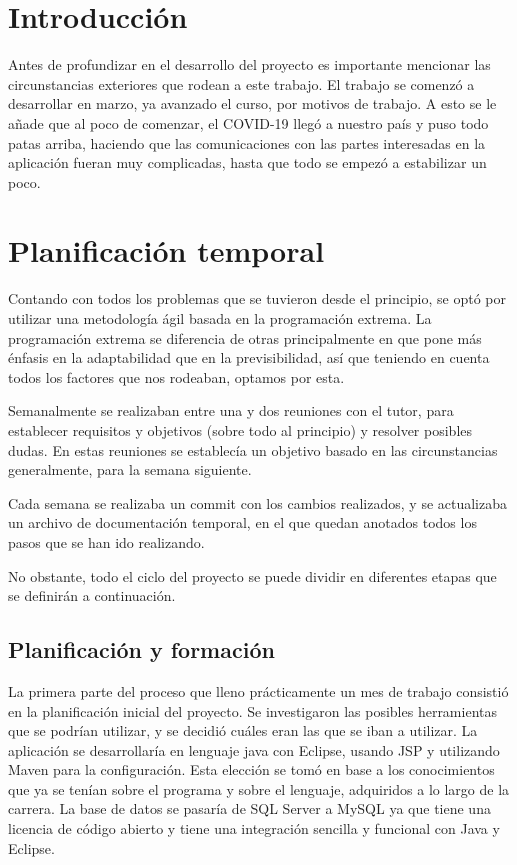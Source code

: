 
\section{Introducción}

Antes de profundizar en el desarrollo del proyecto es importante mencionar las circunstancias exteriores que rodean a este trabajo. El trabajo se comenzó a desarrollar en marzo, ya avanzado el curso, por motivos de trabajo. A esto se le añade que al poco de comenzar, el COVID-19 llegó a nuestro país y puso todo patas arriba, haciendo que las comunicaciones con las partes interesadas en la aplicación fueran muy complicadas, hasta que todo se empezó a estabilizar un poco. 


\section{Planificación temporal}

Contando con todos los problemas que se tuvieron desde el principio, se optó por utilizar una metodología ágil basada en la programación extrema. La programación extrema se diferencia de otras principalmente en que pone más énfasis en la adaptabilidad que en la previsibilidad, así que teniendo en cuenta todos los factores que nos rodeaban, optamos por esta.

Semanalmente se realizaban entre una y dos reuniones con el tutor, para establecer requisitos y objetivos (sobre todo al principio) y resolver posibles dudas. En estas reuniones se establecía un objetivo basado en las circunstancias generalmente, para la semana siguiente. 

Cada semana se realizaba un commit con los cambios realizados, y se actualizaba un archivo de documentación temporal, en el que quedan anotados todos los pasos que se han ido realizando.

No obstante, todo el ciclo del proyecto se puede dividir en diferentes etapas que se definirán a continuación.

\subsection{Planificación y formación}

La primera parte del proceso que lleno prácticamente un mes de trabajo consistió en la planificación inicial del proyecto. Se investigaron las posibles herramientas que se podrían utilizar, y se decidió cuáles eran las que se iban a utilizar. La aplicación se desarrollaría en lenguaje java con Eclipse, usando JSP y utilizando Maven para la configuración. Esta elección se tomó en base a los conocimientos que ya se tenían sobre el programa y sobre el lenguaje, adquiridos a lo largo de la carrera. La base de datos se pasaría de SQL Server a MySQL ya que tiene una licencia de código abierto y tiene una integración sencilla y funcional con Java y Eclipse.

